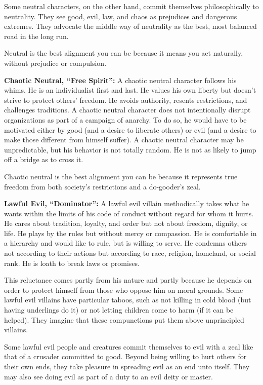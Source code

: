 \documentclass{article}
\begin{document}
Some neutral characters, on the other hand, commit themselves philosophically to 
neutrality. They see good, evil, law, and chaos as prejudices and dangerous extremes. 
They advocate the middle way of neutrality as the best, most balanced road in the 
long run.

Neutral is the best alignment you can be because it means you act naturally, without 
prejudice or compulsion.

\vspace{12pt}
\textbf{Chaotic Neutral, ``Free Spirit'':} A chaotic neutral character follows 
his whims. He is an individualist first and last. He values his own liberty but 
doesn't strive to protect others' freedom. He avoids authority, resents restrictions, 
and challenges traditions. A chaotic neutral character does not intentionally disrupt 
organizations as part of a campaign of anarchy. To do so, he would have to be motivated 
either by good (and a desire to liberate others) or evil (and a desire to make 
those different from himself suffer). A chaotic neutral character may be unpredictable, 
but his behavior is not totally random. He is not as likely to jump off a bridge 
as to cross it.

Chaotic neutral is the best alignment you can be because it represents true freedom 
from both society's restrictions and a do-gooder's zeal.

\vspace{12pt}
\textbf{Lawful Evil, ``Dominator'':} A lawful evil villain methodically takes what 
he wants within the limits of his code of conduct without regard for whom it hurts. 
He cares about tradition, loyalty, and order but not about freedom, dignity, or 
life. He plays by the rules but without mercy or compassion. He is comfortable 
in a hierarchy and would like to rule, but is willing to serve. He condemns others 
not according to their actions but according to race, religion, homeland, or social 
rank. He is loath to break laws or promises.

This reluctance comes partly from his nature and partly because he depends on order 
to protect himself from those who oppose him on moral grounds. Some lawful evil 
villains have particular taboos, such as not killing in cold blood (but having 
underlings do it) or not letting children come to harm (if it can be helped). They 
imagine that these compunctions put them above unprincipled villains.

Some lawful evil people and creatures commit themselves to evil with a zeal like 
that of a crusader committed to good. Beyond being willing to hurt others for their 
own ends, they take pleasure in spreading evil as an end unto itself. They may 
also see doing evil as part of a duty to an evil deity or master.
\end{document}
